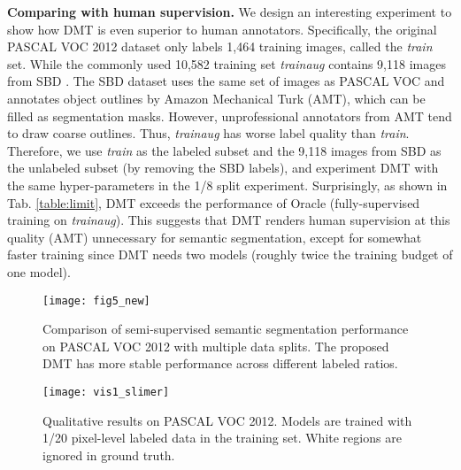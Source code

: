 \documentclass[preprint,review,10pt]{elsarticle}
\begin{document}
\textbf{Comparing with human supervision.} We design an interesting experiment to show how DMT is even superior to human annotators. Specifically, the original PASCAL VOC 2012 dataset only labels 1,464 training images, called the \textit{train} set. While the commonly used 10,582 training set \textit{trainaug} contains 9,118 images from SBD \cite{hariharan2011semantic}. The SBD dataset uses the same set of images as PASCAL VOC and annotates object outlines by Amazon Mechanical Turk (AMT), which can be filled as segmentation masks. However, unprofessional annotators from AMT tend to draw coarse outlines. Thus, \textit{trainaug} has worse label quality than \textit{train}. Therefore, we use \textit{train} as the labeled subset and the 9,118 images from SBD as the unlabeled subset (by removing the SBD labels), and experiment DMT with the same hyper-parameters in the 1/8 split experiment. Surprisingly, as shown in Tab. \ref{table:limit}, DMT exceeds the performance of Oracle (fully-supervised training on \textit{trainaug}). This suggests that DMT renders human supervision at this quality (AMT) unnecessary for semantic segmentation, except for somewhat faster training since DMT needs two models (roughly twice the training budget of one model).
\begin{figure}[t]
\centering
\texttt{[image: fig5\_new]}
\caption{Comparison of semi-supervised semantic segmentation performance on PASCAL VOC 2012 with multiple data splits. The proposed DMT has more stable performance across different labeled ratios. }
\label{fig5}
\end{figure}

\begin{table}[t]
\caption{Mean IoU () comparisons between Oracle and DMT on PASCAL VOC 2012 1464/9118 split. \textit{val} mean IoU () reported.}
\label{table:limit}
\centering
{}
\end{table}

\begin{figure}[t]
\centering
\texttt{[image: vis1\_slimer]}
\caption{Qualitative results on PASCAL VOC 2012. Models are trained with 1/20 pixel-level labeled data in the training set. White regions are ignored in ground truth. }
\label{fig10}
\end{figure}
\end{document}
